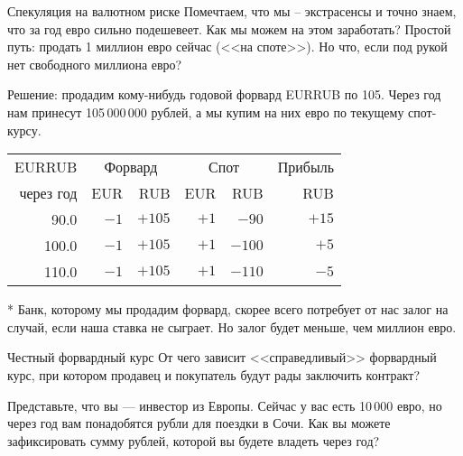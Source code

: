 \documentclass{beamer}
\begin{document}
\begin{frame}{Спекуляция на валютном риске}
\justify
Помечтаем, что мы -- экстрасенсы и точно знаем, что за год евро сильно подешевеет. Как мы можем на этом заработать? Простой путь: продать 1 миллион евро сейчас (<<на споте>>). Но что, если под рукой нет свободного миллиона евро?

\justify
Решение: продадим кому-нибудь годовой форвард EURRUB по 105. Через год нам принесут 105\,000\,000 рублей, а мы купим на них евро по текущему спот-курсу.

\justify
\centering
\begin{tabular}{r|r|r|r|r|r}
EURRUB      & \multicolumn{2}{c|}{Форвард} & \multicolumn{2}{c|}{Спот} & Прибыль \\
\cline{2-5}
через год & EUR     & RUB     & EUR     & RUB      & RUB \\ \hline
90.0      & $-1$ & $+105$  & $+1$  & $-90$  & $+15$ \\
100.0      & $-1$ & $+105$  & $+1$  & $-100$  & $+5$ \\
110.0     & $-1$ & $+105$  & $+1$   & $-110$ & $-5$ \\
\end{tabular}
 
\justify
* Банк, которому мы продадим форвард, скорее всего потребует от нас залог на случай, если наша ставка не сыграет. Но залог будет меньше, чем миллион евро.
\end{frame}



\begin{frame}{Честный форвардный курс}
\justify
От чего зависит <<справедливый>> форвардный курс, при котором продавец и покупатель будут рады заключить контракт? 

\justify
Представьте, что вы --- инвестор из Европы. Сейчас у вас есть 10\,000 евро, но через год вам понадобятся рубли для поездки в Сочи. Как вы можете зафиксировать сумму рублей, которой вы будете владеть через год? 
\end{frame}
\end{document}

